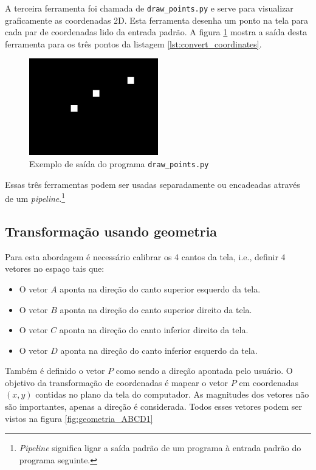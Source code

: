 \documentclass[brazil,pagestart=firstchapter]{abnt}
\makeatletter
\newcommand*{\ie}{i.e.\@\xspace}
\makeatother
\begin{document}
A terceira ferramenta foi chamada de \texttt{draw\_points.py} e serve para
visualizar graficamente as coordenadas 2D. Esta ferramenta desenha um ponto
na tela para cada par de coordenadas lido da entrada padrão. A figura
\ref{fig:draw_points} mostra a saída desta ferramenta para os três pontos da
listagem \ref{lst:convert_coordinates}.

\begin{figure}[h]
\centering
\includegraphics[width=0.5\textwidth]{img/draw_points_example.png}
\caption{Exemplo de saída do programa \texttt{draw\_points.py}}
\label{fig:draw_points}
\end{figure}

Essas três ferramentas podem ser usadas separadamente ou encadeadas através
de um \textit{pipeline}.\footnote{
	\textit{Pipeline} significa ligar a saída padrão de um programa à
	entrada padrão do programa seguinte.
}


\subsection{Transformação usando geometria}
\label{sub:coord_geometria}

Para esta abordagem é necessário calibrar os 4 cantos da tela, \ie, definir
4 vetores no espaço tais que:

\begin{itemize}
\item O vetor $A$ aponta na direção do canto superior esquerdo da tela.
\item O vetor $B$ aponta na direção do canto superior direito da tela.
\item O vetor $C$ aponta na direção do canto inferior direito da tela.
\item O vetor $D$ aponta na direção do canto inferior esquerdo da tela.
\end{itemize}

Também é definido o vetor $P$ como sendo a direção apontada pelo usuário. O
objetivo da transformação de coordenadas é mapear o vetor $P$ em coordenadas
$(x, y)$ contidas no plano da tela do computador. As magnitudes dos vetores
não são importantes, apenas a direção é considerada. Todos esses vetores
podem ser vistos na figura \ref{fig:geometria_ABCD1}
\end{document}
